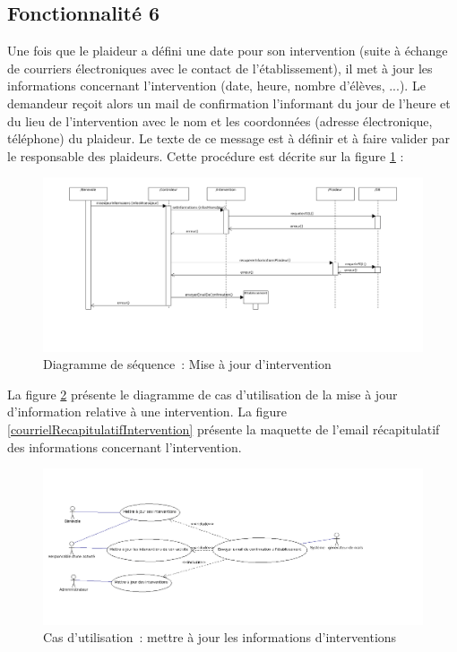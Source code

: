 \subsection{Fonctionnalité 6}
Une fois que le plaideur a défini une date pour son intervention (suite à échange de courriers électroniques avec le contact de l'établissement), il met à jour les informations concernant l'intervention (date, heure, nombre d'élèves, ...). Le demandeur reçoit alors un mail de confirmation l'informant du jour de l'heure et du lieu de l'intervention avec le nom et les coordonnées (adresse électronique, téléphone) du plaideur. Le texte de ce message est à définir et à faire valider par le responsable des plaideurs. Cette procédure est décrite sur la figure \ref{diagrammeSequenceMiseAJourIntervention} : 
\begin{figure}[H]
	\centering
	\includegraphics[scale=0.35]{images/diagrammeSequence}
	 \caption{Diagramme de séquence~: Mise à jour d'intervention}
	 \label{diagrammeSequenceMiseAJourIntervention}
\end{figure}

  La figure \ref{mettreAJourInterventions} présente le diagramme de cas d'utilisation de la mise à jour d'information relative à une intervention. La figure \ref{courrielRecapitulatifIntervention} présente la maquette de l'email récapitulatif des informations concernant l'intervention. 
 
\begin{figure}[H]
	\centering
	\includegraphics[scale=0.4]{images/casDUtilisation/fonctionnalite6MiseAJourIntervention.png}
	 \caption{Cas d'utilisation~: mettre à jour les informations d'interventions}
	 \label{mettreAJourInterventions}
\end{figure}



